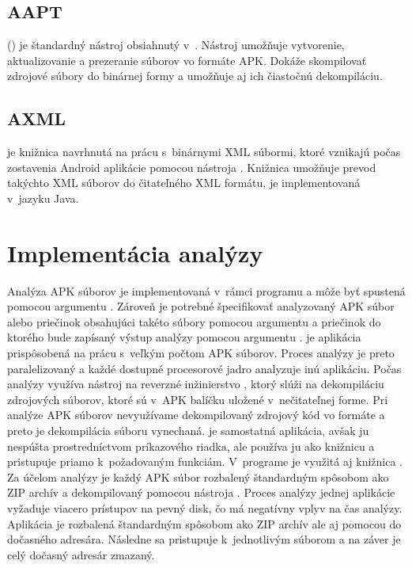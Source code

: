 \subsection{AAPT}
\label{AAPT}

 () je štandardný nástroj obsiahnutý v~. Nástroj  umožňuje vytvorenie, aktualizovanie a prezeranie súborov vo formáte APK. Dokáže skompilovať zdrojové súbory do binárnej formy a umožňuje aj ich čiastočnú dekompiláciu\cite{aapt}.

\subsection{AXML}
\label{AXML}
 je knižnica navrhnutá na prácu s~binárnymi XML súbormi, ktoré vznikajú počas zostavenia Android aplikácie pomocou nástroja . Knižnica umožňuje prevod takýchto XML súborov do čitateľného XML formátu, je implementovaná v~jazyku Java.

\section{Implementácia analýzy}
Analýza APK súborov je implementovaná v~rámci programu  a môže byť spustená pomocou argumentu . Zároveň je potrebné špecifikovať analyzovaný APK súbor alebo priečinok obsahujúci takéto súbory pomocou argumentu  a priečinok do ktorého bude zapísaný výstup analýzy pomocou argumentu .  je aplikácia prispôsobená na prácu s~veľkým počtom APK súborov. Proces analýzy je preto paralelizovaný a každé dostupné procesorové jadro analyzuje inú aplikáciu. Počas analýzy využíva  nástroj na reverzné inžinierstvo , ktorý slúži na dekompiláciu zdrojových súborov, ktoré sú v~APK balíčku uložené v~nečitateľnej forme. Pri analýze APK súborov nevyužívame dekompilovaný zdrojový kód vo formáte  a preto je dekompilácia súboru  vynechaná.  je samostatná aplikácia, avšak  ju nespúšta prostredníctvom príkazového riadka, ale používa ju ako knižnicu a pristupuje priamo k~požadovaným funkciám. V~programe je využitá aj knižnica . Za účelom analýzy je každý APK súbor rozbalený štandardným spôsobom ako ZIP archív a dekompilovaný pomocou nástroja . Proces analýzy jednej aplikácie vyžaduje viacero prístupov na pevný disk, čo má negatívny vplyv na čas analýzy. Aplikácia je rozbalená štandardným spôsobom ako ZIP archív ale aj pomocou  do dočasného adresára. Následne sa pristupuje k~jednotlivým súborom a na záver je celý dočasný adresár zmazaný.

